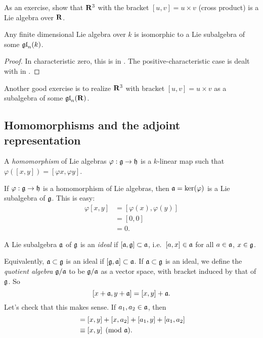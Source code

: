 As an exercise, show that $\mathbf{R}^3$ with the bracket $[u,v]=u\times v$ (cross 
product) is a Lie algebra over $\mathbf{R}$. 

\begin{theorem}[Ado]
Any finite dimensional Lie algebra over $k$ is isomorphic to a Lie subalgebra 
of some $\mathfrak{gl}_n(k)$. 
\end{theorem}
\begin{proof}
In characteristic zero, this is in \cite[I \S 7.3]{bourbaki-lie-alg-1-3}. The 
positive-characteristic case is dealt with in \cite[VI \S3]{jacobson-1979}.
\end{proof}

Another good exercise is to realize $\mathbf{R}^3$ with bracket $[u,v]=u\times v$ as 
a subalgebra of some $\mathfrak{gl}_n(\mathbf{R})$. 





\subsection{Homomorphisms and the adjoint representation}

\begin{definition}
A \emph{homomorphism} of Lie algebras $\varphi:\mathfrak{g}\to \mathfrak{h}$ is a $k$-linear map 
such that $\varphi([x,y])=[\varphi x,\varphi y]$. 
\end{definition}

If $\varphi:\mathfrak{g}\to \mathfrak{h}$ is a homomorphism of Lie algebras, then 
$\mathfrak{a}=\ker(\varphi)$ is a Lie subalgebra of $\mathfrak{g}$. This is easy: 
\begin{align*}
  \varphi[x,y]
    &= [\varphi(x),\varphi(y)] \\
    &= [0,0] \\
    &= 0 .
\end{align*}

\begin{definition}
A Lie subalgebra $\mathfrak{a}$ of $\mathfrak{g}$ is an \emph{ideal} if 
$[\mathfrak{a},\mathfrak{g}]\subset \mathfrak{a}$, i.e.~$[a,x]\in \mathfrak{a}$ for all $a\in \mathfrak{a}$, $x\in \mathfrak{g}$. 
\end{definition}

Equivalently, $\mathfrak{a}\subset \mathfrak{g}$ is an ideal if $[\mathfrak{g},\mathfrak{a}]\subset \mathfrak{a}$. If 
$\mathfrak{a}\subset \mathfrak{g}$ is an ideal, we define the \emph{quotient algebra} $\mathfrak{g}/\mathfrak{a}$ 
to be $\mathfrak{g}/\mathfrak{a}$ as a vector space, with bracket induced by that of $\mathfrak{g}$. So 
\[
  [x+\mathfrak{a},y+\mathfrak{a}] = [x,y]+\mathfrak{a} .
\]
Let's check that this makes sense. If $a_1,a_2\in \mathfrak{a}$, then 
\begin{align*}
  [x+a_1,x+a_2] 
    &= [x,y] + [x,a_2]+[a_1,y]+[a_1,a_2] \\
    &\equiv [x,y] \pmod \fa .
\end{align*}

